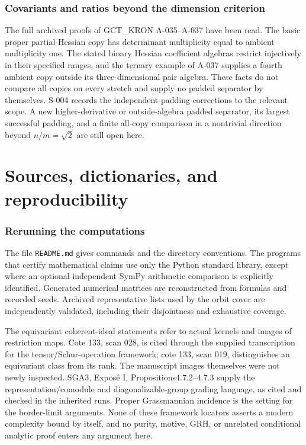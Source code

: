 \documentclass[11pt]{article}
\begin{document}
\section{Covariants and ratios beyond the dimension criterion}
The full archived proofs of GCT\_KRON A-035--A-037 have been read.
The basic proper partial-Hessian copy has determinant multiplicity
equal to ambient multiplicity one. The stated binary Hessian coefficient
algebras restrict injectively in their specified ranges, and the
ternary example of A-037 supplies a fourth ambient copy outside its
three-dimensional pair algebra. These facts do not compare all copies
on every stretch and supply no padded separator by themselves.
S-004 records the independent-padding corrections to the relevant
scope. A new higher-derivative or outside-algebra padded separator,
its largest successful padding, and a finite all-copy comparison in
a nontrivial direction beyond $n/m=\sqrt2$ are still open here.

\part{Sources, dictionaries, and reproducibility}

\section{Rerunning the computations}
The file \texttt{README.md} gives commands and the directory conventions.
The programs that certify mathematical claims use only the Python
standard library, except where an optional independent SymPy arithmetic
comparison is explicitly identified. Generated numerical matrices are
reconstructed from formulas and recorded seeds. Archived representative
lists used by the orbit cover are independently validated, including
their disjointness and exhaustive coverage.

The equivariant coherent-ideal statements refer to actual kernels and
images of restriction maps. Cote 133, scan 028, is cited through the
supplied transcription for the tensor/Schur-operation framework;
cote 133, scan 019, distinguishes an equivariant class from its rank.
The manuscript images themselves were not newly inspected. SGA3,
Expos\'e I, Propositions4.7.2--4.7.3 supply the representation/comodule
and diagonalizable-group grading language, as cited and checked in the
inherited runs. Proper Grassmannian incidence is the setting for the
border-limit arguments. None of these framework locators asserts a
modern complexity bound by itself, and no purity, motive, GRH, or
unrelated conditional analytic proof enters any argument here.
\end{document}
